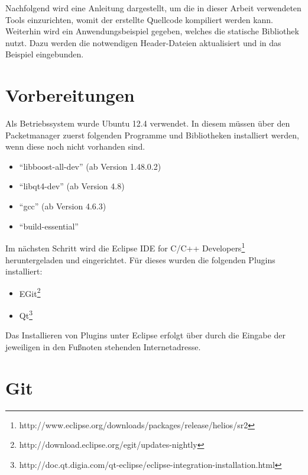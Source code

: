 Nachfolgend wird eine Anleitung dargestellt, um die in
dieser Arbeit verwendeten Tools einzurichten, womit der erstellte
Quellcode kompiliert werden kann. Weiterhin wird ein Anwendungsbeispiel
gegeben, welches die statische Bibliothek nutzt. Dazu werden die notwendigen
Header-Dateien aktualisiert und in das Beispiel eingebunden.

\section{Vorbereitungen}

Als Betriebssystem wurde Ubuntu 12.4 verwendet. In diesem m{\"u}ssen
{\"u}ber den Packetmanager zuerst folgenden Programme und Bibliotheken installiert
werden, wenn diese noch nicht vorhanden sind.

\begin{itemize}
\item "`libboost-all-dev"' (ab Version 1.48.0.2) 
\item "`libqt4-dev"' (ab Version 4.8)
\item "`gcc"' (ab Version 4.6.3)
\item "`build-essential"'
\end{itemize}

Im n{\"a}chsten Schritt wird die Eclipse IDE for C/C++
Developers\footnote{http://www.eclipse.org/downloads/packages/release/helios/sr2}
heruntergeladen und eingerichtet. F{\"u}r dieses wurden die folgenden Plugins installiert:

\begin{itemize}
\item EGit\footnote{http://download.eclipse.org/egit/updates-nightly}
\item
Qt\footnote{http://doc.qt.digia.com/qt-eclipse/eclipse-integration-installation.html}
\end{itemize}

Das Installieren von Plugins unter Eclipse erfolgt {\"u}ber  durch die Eingabe der jeweiligen in den Fu{\ss}noten
stehenden Internetadresse.

\section{Git}

